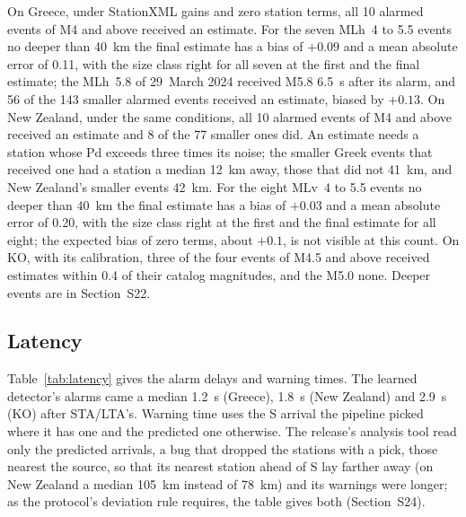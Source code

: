 \documentclass[a4paper,fleqn]{cas-sc}
\newcommand{\stalta}{STA/LTA}
\begin{document}
On Greece, under StationXML gains and zero station terms, all 10 alarmed events of
M4 and above received an estimate. For the seven MLh~4 to 5.5 events no deeper than
40~km the final estimate has a bias of $+0.09$ and a mean absolute error of 0.11,
with the size class right for all seven at the first and the final estimate; the
MLh~5.8 of 29~March 2024 received M5.8 6.5~s after its alarm, and 56 of the 143
smaller alarmed events received an estimate, biased by $+0.13$. On New Zealand, under
the same conditions, all 10
alarmed events of M4 and above received an estimate and 8 of the 77 smaller ones did.
An estimate needs a station whose Pd exceeds three times its noise; the smaller Greek
events that received one had a station a median 12~km away, those that did not
41~km, and New Zealand's smaller events 42~km.
For the eight MLv~4 to 5.5 events no deeper than 40~km the final estimate has a bias
of $+0.03$ and a mean absolute error of 0.20, with the size class right at the first
and the final estimate for all eight; the expected bias of zero terms, about $+0.1$,
is not visible at this count. On KO, with its calibration, three of the four
events of M4.5 and above received estimates within 0.4 of their catalog magnitudes,
and the M5.0 none. Deeper events are in Section~S22.

\subsection{Latency}\label{sec:latency}

Table~\ref{tab:latency} gives the alarm delays and warning times. The learned
detector's alarms came a median 1.2~s (Greece), 1.8~s (New Zealand) and 2.9~s (KO)
after \stalta{}'s. Warning time uses the S arrival the pipeline
picked where it has one and the predicted one otherwise. The release's analysis tool
read only the predicted arrivals, a bug that dropped the stations with a pick, those
nearest the source, so that its nearest station ahead of S lay farther away (on New
Zealand a median 105~km instead of 78~km) and its warnings were longer; as the
protocol's deviation rule requires, the table gives both (Section~S24).
\end{document}
